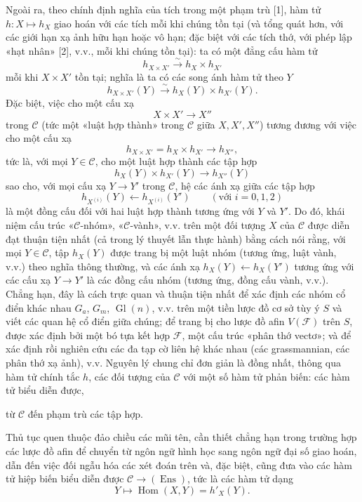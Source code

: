 Ngoài ra, theo chính định nghĩa của tích trong một phạm trù [1], hàm tử
$h:X\longmapsto h_X$ giao hoán với các tích mỗi khi chúng tồn tại (và tổng
quát hơn, với các giới hạn xạ ảnh hữu hạn hoặc vô hạn; đặc biệt với các tích
thớ, với phép lập «hạt nhân» [2], v.v., mỗi khi chúng tồn tại): ta có một
đẳng cấu hàm tử
\[
  h_{X\times X'}\xrightarrow{\sim}h_X\times h_{X'}
\]
mỗi khi $X\times X'$ tồn tại; nghĩa là ta có các song ánh hàm tử theo $Y$
\[
  h_{X\times X'}(Y)\xrightarrow{\sim}h_X(Y)\times h_{X'}(Y).
\]
Đặc biệt, việc cho một cấu xạ
\[
  X\times X'\longrightarrow X''
\]
trong $\mathcal C$ (tức một «luật hợp thành» trong $\mathcal C$ giữa
$X,X',X''$) tương đương với việc cho một cấu xạ
\[
  h_{X\times X'}=h_X\times h_{X'}\longrightarrow h_{X''},
\]
tức là, với mọi $Y\in\mathcal C$, cho một luật hợp thành các tập hợp
\[
  h_X(Y)\times h_{X'}(Y)\longrightarrow h_{X''}(Y)
\]
sao cho, với mọi cấu xạ $Y\longrightarrow Y'$ trong $\mathcal C$, hệ các ánh
xạ giữa các tập hợp
\[
  h_{X^{(i)}}(Y)\longleftarrow h_{X^{(i)}}(Y')
  \qquad(\text{với }i=0,1,2)
\]
là một đồng cấu đối với hai luật hợp thành tương ứng với $Y$ và $Y'$. Do đó,
khái niệm cấu trúc «$\mathcal C$-nhóm», «$\mathcal C$-vành», v.v. trên một
đối tượng $X$ của $\mathcal C$ được diễn đạt thuận tiện nhất (cả trong lý
thuyết lẫn thực hành) bằng cách nói rằng, với mọi $Y\in\mathcal C$, tập
$h_X(Y)$ được trang bị một luật nhóm (tương ứng, luật vành, v.v.) theo nghĩa
thông thường, và các ánh xạ
$h_X(Y)\longleftarrow h_X(Y')$ tương ứng với các cấu xạ
$Y\longrightarrow Y'$ là các đồng cấu nhóm (tương ứng, đồng cấu vành, v.v.).
Chẳng hạn, đây là cách trực quan và thuận tiện nhất để xác định các nhóm cổ
điển khác nhau $G_a$, $G_m$, $\operatorname{Gl}(n)$, v.v. trên một tiền lược
đồ cơ sở tùy ý $S$ và viết các quan hệ cổ điển giữa chúng; để trang bị cho
lược đồ afin $V(\mathcal F)$ trên $S$, được xác định bởi một bó tựa kết hợp
$\mathcal F$, một cấu trúc «phân thớ vectơ»; và để xác định rồi nghiên cứu
các đa tạp cờ liên hệ khác nhau (các grassmannian, các phân thớ xạ ảnh),
v.v. Nguyên lý chung chỉ đơn giản là đồng nhất, thông qua hàm tử chính tắc
$h$, các đối tượng của $\mathcal C$ với một số hàm tử phản biến: các hàm tử
biểu diễn được,

từ $\mathcal C$ đến phạm trù các tập hợp.

Thủ tục quen thuộc đảo chiều các mũi tên, cần thiết chẳng hạn trong trường hợp
các lược đồ afin để chuyển từ ngôn ngữ hình học sang ngôn ngữ đại số giao
hoán, dẫn đến việc đối ngẫu hóa các xét đoán trên và, đặc biệt, cũng đưa vào
các hàm tử hiệp biến biểu diễn được
$\mathcal C\longrightarrow(\operatorname{Ens})$, tức là các hàm tử dạng
\[
  Y\longmapsto\operatorname{Hom}(X,Y)=h'_X(Y).
\]

